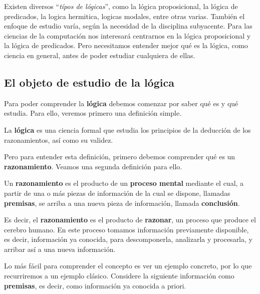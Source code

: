 Existen diversos ``\textit{típos de lógicas}'', como la lógica proposicional, la
lógica de predicados, la logica hermitica, logicas modales, entre otras varias.
También el enfoque de estudio varía, según la necesidad de la disciplina
subyacente. Para las ciencias de la computación nos interesará centrarnos en la
lógica proposicional y la lógica de predicados. Pero necesitamos entender mejor
qué es la lógica, como ciencia en general, antes de poder estudiar cualquiera de
ellas.

\subsection{El objeto de estudio de la lógica}
\label{chap:logica:subsec:objeto_de_estudio}

Para poder comprender la \textbf{lógica} debemos comenzar por saber qué es y qué estudia. Para ello, veremos primero una definición simple.

\begin{definition} La \textbf{lógica} es una ciencia formal
    que estudia los principios de la deducción de los razonamientos, así como su
    validez.
\end{definition}

Pero para entender esta definición, primero debemos comprender qué es un
\textbf{razonamiento}. Veamos una segunda definición para ello.

\begin{definition}
    Un \textbf{razonamiento} es el producto de un \textbf{proceso mental}
    mediante el cual, a partir de una o más piezas de información de la cual se
    dispone, llamadas \textbf{premisas}, se arriba a una nueva pieza de
    información, llamada \textbf{conclusión}.
\end{definition}

Es decir, el \textbf{razonamiento} es el producto de
\textbf{razonar}, un proceso que produce el cerebro humano. En
este proceso tomamos información previamente disponible, es decir, información
ya conocida, para descomponerla, analizarla y procesarla, y arribar así a una
nueva información.

Lo más fácil para comprender el concepto es ver un ejemplo concreto, por lo que
recurriremos a un ejemplo clásico. Considere la siguiente información como
\textbf{premisas}, es decir, como información ya conocida a priori.

